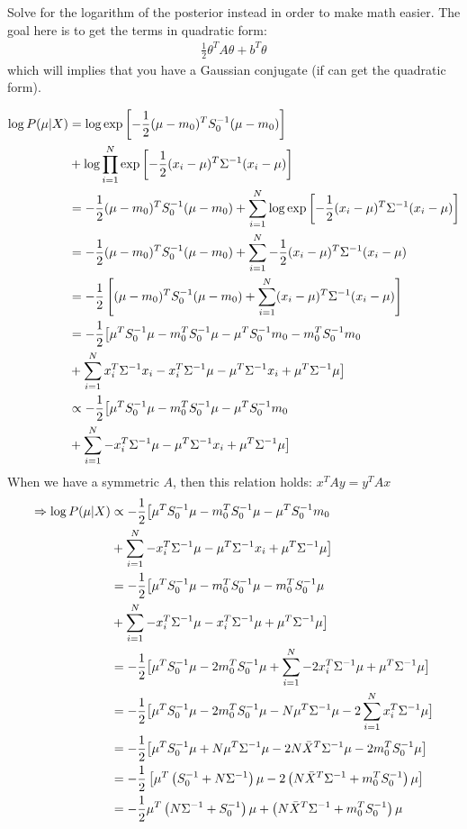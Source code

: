 \documentclass[12pt]{article}
\begin{document}
    Solve for the logarithm of the posterior instead in order to make math easier. The goal here is to get the terms in quadratic form:
    \begin{align}
        \frac{1}{2} \theta^T A \theta + b^T \theta
    \end{align}
    which will implies that you have a Gaussian conjugate (if can get the quadratic form).

    \newcommand{\sn}{S_0^{-1}}
    \newcommand{\precmat}{\Sigma^{-1}}

    \begin{align}
        \log P(\mu | X) &= \log \mvnexpo[\mu]{m_0}{S_0} \\
        &+ \log \prodlim[i]{1}{N} \mvnexpo[x_i]{\mu}{\Sigma} \\
        &= -\frac{1}{2}(\mu-m_0)^T \sn (\mu-m_0) + \sumlim{1}{N} \log \mvnexpo[x_i]{\mu}{\Sigma} \\
        &= -\frac{1}{2}(\mu-m_0)^T \sn (\mu-m_0) + \sumlim{1}{N} -\frac{1}{2} (x_i-\mu)^T \Sigma^{-1} (x_i-\mu) \\
        &= -\frac{1}{2} \left[ (\mu-m_0)^T \sn (\mu-m_0) + \sumlim{1}{N} (x_i-\mu)^T \Sigma^{-1} (x_i-\mu) \right] \\
        &= -\frac{1}{2} \big[ \mu^T\sn\mu - m_0^T\sn\mu - \mu^T\sn m_0 - m_0^T \sn m_0 \\
        &+ \sumlim{1}{N} x_i^T \precmat x_i - x_i^T \precmat \mu - \mu^T \precmat x_i + \mu^T \precmat \mu\big] \\
        &\propto -\frac{1}{2} \big[ \mu^T\sn\mu - m_0^T\sn\mu - \mu^T\sn m_0 \\
        &+ \sumlim{1}{N} - x_i^T \precmat \mu - \mu^T \precmat x_i + \mu^T \precmat \mu \big] \\ 
    \end{align}
    When we have a symmetric $A$, then this relation holds: $x^T A y = y^T A x$
    \begin{align}
        \Rightarrow \log P(\mu | X) &\propto -\frac{1}{2} \big[ \mu^T\sn\mu - m_0^T\sn\mu - \mu^T\sn m_0 \\
        &+ \sumlim{1}{N} - x_i^T \precmat \mu - \mu^T \precmat x_i + \mu^T \precmat \mu \big] \\ 
        &= -\frac{1}{2} \big[ \mu^T\sn\mu - m_0^T\sn\mu - m_0^T\sn \mu \\
        &+ \sumlim{1}{N} - x_i^T \precmat \mu - x_i^T \precmat \mu + \mu^T \precmat \mu \big] \\ 
        &= -\frac{1}{2} \big[ \mu^T\sn\mu - 2 m_0^T\sn\mu + \sumlim{1}{N} - 2 x_i^T \precmat \mu + \mu^T \precmat \mu \big] \\
        &= -\frac{1}{2} \big[ \mu^T\sn\mu - 2 m_0^T\sn\mu - N \mu^T \precmat \mu - 2\sumlim{1}{N} x_i^T \precmat \mu \big] \\
        &= -\frac{1}{2} \big[ \mu^T\sn\mu + N \mu^T \precmat \mu - 2 N \bar{X}^T \precmat \mu - 2 m_0^T\sn\mu  \big] \\
        &= -\frac{1}{2} \left[ \mu^T\left(\sn+N\precmat\right)\mu  - 2\left(N\bar{X}^T\precmat + m_0^T\sn\right)\mu \right] \\
        &= -\frac{1}{2} \mu^T\left(N\precmat+\sn\right)\mu  + \left(N\bar{X}^T\precmat + m_0^T\sn\right)\mu 
    \end{align}
\end{document}
